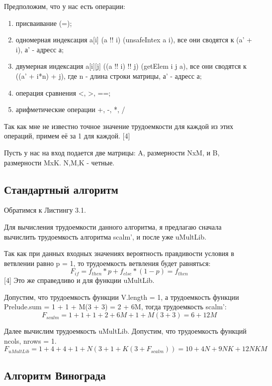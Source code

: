 \documentclass[12pt]{report}
\begin{document}
Предположим, что у нас есть операции:
\begin{enumerate}
	\item присваивание (=);
	\item одномерная индексация a[i] (a !! i) (unsafeIntex a i), все они сводятся к (a' + i), а' - адресс а;
	\item двумерная индексация a[i][j] ((a !! i) !! j) (getElem i j a), все они сводятся к ((a' + i*n) + j), где n - длина строки матрицы, а' - адресс а;
	\item операция сравнения <, >, ==;
	\item арифметические операции +, -, *, /
\end{enumerate}

Так как мне не известно точное значение трудоемкости для каждой из этих операций, примем её за 1 для каждой. [4]

Пусть у нас на вход подается две матрицы: A, размерности NxM, и B, размерности MxK.
N,M,K - четные.

\subsection{Стандартный алгоритм}

Обратимся к Листингу 3.1.

Для вычисления трудоемкости данного алгоритма, я предлагаю сначала вычислить трудоемкость алгоритма scalm', и после уже uMultLib.

Так как при данных входных значениях вероятность правдивости условия в ветвлении равно p = 1, то трудоемкость ветвления будет равняться:
\begin{equation}
	F_{if} = f_{then}*p + f_{else}*(1-p) = f_{then}
\end{equation}[4]
Это же справедливо и для функции uMultLib.

Допустим, что трудоемкость функции V.length = 1, а трудоемкость функции Prelude.sum = 1 + 1 + M(3 + 3) = 2 + 6M, тогда
трудоемкость scalm':
\begin{equation}
	F_{scalm} = 1 + 1 + 1 + 2 + 6M + 1 + M(3 + 3) = 6 + 12M
\end{equation}

Далее вычислим трудоемкость uMultLib.
Допустим, что трудоемкость функций ncols, nrows = 1.
\begin{equation}
	F_{uMultLib} = 1 + 4 + 4 +  1 + N(3 + 1 + K(3 + F_{scalm})) = 10 + 4N + 9NK + 12NKM
\end{equation}

\subsection{Алгоритм Винограда}
\end{document}
